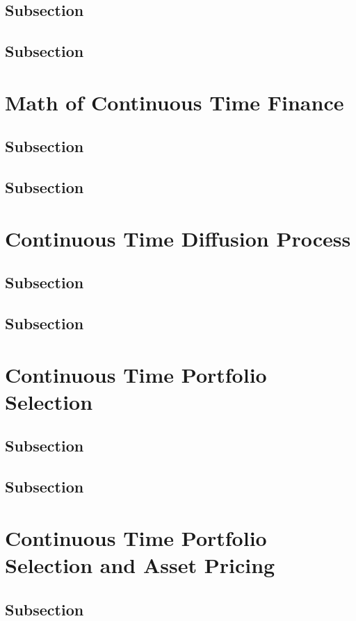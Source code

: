\documentclass[
14pt,notheorems,hyperref={pdfauthor=whatever}
]{beamer}
\begin{document}
\subsection{Subsection}
\subsection{Subsection}

\section{Math of Continuous Time Finance}
\subsection{Subsection}
\subsection{Subsection}

\section{Continuous Time Diffusion Process}
\subsection{Subsection}
\subsection{Subsection}

\section{Continuous Time Portfolio Selection}
\subsection{Subsection}
\subsection{Subsection}

\section{Continuous Time Portfolio Selection and Asset Pricing}
\subsection{Subsection}
\end{document}
